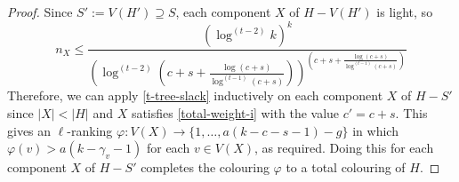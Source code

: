 \documentclass[kpfonts]{patmorin}
\theoremstyle{named}
\begin{document}
\begin{proof}
    Since $S':=V(H')\supseteq S$, each component $X$ of $H-V(H')$ is light, so
   \[
       n_{X} \le \frac{(\log^{(t-2)} k)^k}{
        \left(
            \log^{(t-2)}
                \left(
                   c+s+\tfrac{\log(c+s)}{\log^{(t-1)}(c+s)}
               \right)
        \right)^{\left(
           c+s+\tfrac{\log(c+s)}{\log^{(t-1)}(c+s)}
       \right)}
       }
   \]
   Therefore, we can apply \cref{t-tree-slack} inductively on each component $X$ of $H-S'$ since $|X|<|H|$ and $X$ satisfies \cref{total-weight-i} with the value $c'=c+s$.  This gives an $\ell$-ranking $\varphi:V(X)\to\{1,\ldots,a(k-c-s-1)-g\}$ in which $\varphi(v)> a(k-\gamma_v-1)$ for each $v\in V(X)$, as required.
   Doing this for each component $X$ of $H-S'$ completes the colouring $\varphi$ to a total colouring of $H$.


\end{proof}
\end{document}

